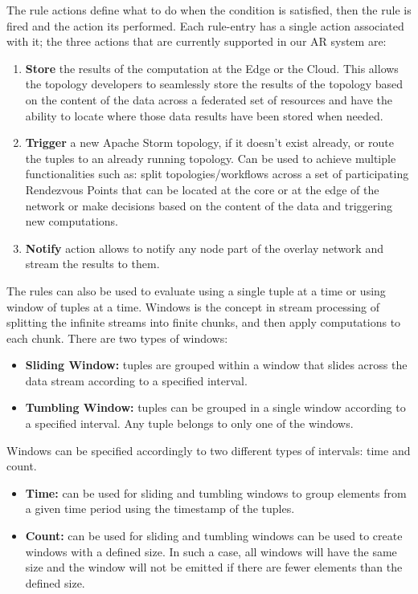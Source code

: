 \noindent The rule actions define what to do when the condition is satisfied, then the rule is fired and the action its performed. Each rule-entry has a single action associated with it; the three actions that are currently supported in our AR system are:

\begin{enumerate}
  \item \textbf{Store} the results of the computation at the Edge or the Cloud. This allows the topology developers to seamlessly store the results of the topology based on the content of the data across a federated set of resources and have the ability to locate where those data results have been stored when needed.
  \item \textbf{Trigger} a new Apache Storm topology, if it doesn't exist already, or route the tuples to an already running topology. Can be used to achieve multiple functionalities such as: split topologies/workflows across a set of participating Rendezvous Points that can be located at the core or at the edge of the network or make decisions based on the content of the data and triggering new computations.
  \item \textbf{Notify} action allows to notify any node part of the overlay network and stream the results to them.
\end{enumerate}

\noindent The rules can also be used to evaluate using a single tuple at a time or using window of tuples at a time. Windows is the concept in stream processing of splitting the infinite streams into finite chunks, and then apply computations to each chunk. There are two types of windows:

\begin{itemize}
    \item \textbf{Sliding Window:} tuples are grouped within a window that slides across the data stream according to a specified interval.
    \item \textbf{Tumbling Window:} tuples can be grouped in a single window according to a specified interval. Any tuple belongs to only one of the windows.
\end{itemize}

\noindent Windows can be specified accordingly to two different types of intervals: time and count.

\begin{itemize}
    \item \textbf{Time:} can be used for sliding and tumbling windows to group elements from a given time period using the timestamp of the tuples.
    \item \textbf{Count:} can be used for sliding and tumbling windows can be used to create windows with a defined size. In such a case, all windows will have the same size and the window will not be emitted if there are fewer elements than the defined size.
\end{itemize}

